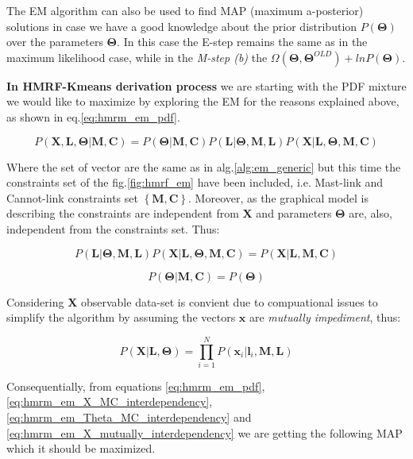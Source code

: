 \documentclass[dvips,dvipdfm,pdftex]{llncs}
\begin{document}
The EM algorithm can also be used to find MAP (maximum a-posterior) solutions in case we have a good knowledge about the prior distribution $P(\mathbf{\Theta})$ over the parameters $\mathbf{\Theta}$. In this case the E-step remains the same as in the maximum likelihood case, while in the \emph{M-step (b)} the $\Omega(\mathbf{\Theta},\mathbf{\Theta}^{OLD})+lnP(\mathbf{\Theta})$.

\textbf{In HMRF-Kmeans derivation process} we are starting with the PDF mixture we would like to maximize by exploring the EM for the reasons explained above, as shown in eq.\ref{eq:hmrm_em_pdf}.

\begin{equation}
	P(\mathbf{X,L,\Theta}|\mathbf{M,C})=P(\mathbf{\Theta}|\mathbf{M,C})P(\mathbf{L}|\mathbf{\Theta,M,L})P(\mathbf{X}|\mathbf{L,\Theta,M,C})
\label{eq:hmrm_em_pdf}
\end{equation}

Where the set of vector are the same as in alg.\ref{alg:em_generic} but this time the constraints set of the fig.\ref{fig:hmrf_em} have been included, i.e. Mast-link and Cannot-link constraints set $\left\{\mathbf{M,C}\right\}$. Moreover, as the graphical model is describing the constraints are independent from $\mathbf{X}$ and parameters $\mathbf{\Theta}$ are, also, independent from the constraints set. Thus:

\begin{equation}
	P(\mathbf{L}|\mathbf{\Theta,M,L})P(\mathbf{X}|\mathbf{L,\Theta,M,C})=P(\mathbf{X}|\mathbf{L,M,C})
\label{eq:hmrm_em_X_MC_interdependency}
\end{equation}

\begin{equation}
	P(\mathbf{\Theta}|\mathbf{M,C})=P(\mathbf{\Theta})
\label{eq:hmrm_em_Theta_MC_interdependency}
\end{equation}

Considering $\mathbf{X}$ observable data-set is convient due to compuational issues to simplify the algorithm by assuming the vectors $\mathbf{x}$ are \emph{mutually impediment}, thus:

\begin{equation}
	P(\mathbf{X}|\mathbf{L,\Theta})=\prod_{i=1}^{N}P(\mathbf{x}_{i}|\mathbf{l}_{i},\mathbf{M,L})
\label{eq:hmrm_em_X_mutually_interdependency}
\end{equation}

Consequentially, from equations \ref{eq:hmrm_em_pdf}, \ref{eq:hmrm_em_X_MC_interdependency}, \ref{eq:hmrm_em_Theta_MC_interdependency} and \ref{eq:hmrm_em_X_mutually_interdependency} we are getting the following MAP which it should be maximized.
\end{document}
